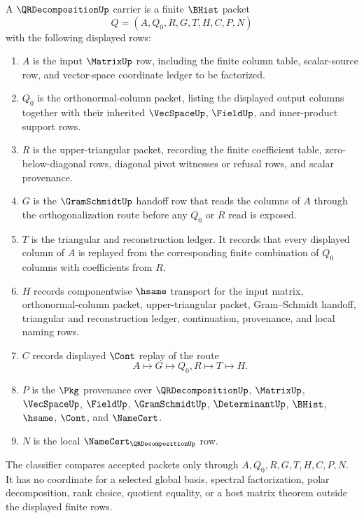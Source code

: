 \begin{definition}
\label{def:qr-decomposition-carrier}
A $\QRDecompositionUp$ carrier is a finite $\BHist$ packet
$$
Q=(A,Q_0,R,G,T,H,C,P,N)
$$
with the following displayed rows:
\begin{enumerate}
\item $A$ is the input $\MatrixUp$ row, including the finite column table, scalar-source row, and vector-space coordinate ledger to be factorized.
\item $Q_0$ is the orthonormal-column packet, listing the displayed output columns together with their inherited $\VecSpaceUp$, $\FieldUp$, and inner-product support rows.
\item $R$ is the upper-triangular packet, recording the finite coefficient table, zero-below-diagonal rows, diagonal pivot witnesses or refusal rows, and scalar provenance.
\item $G$ is the $\GramSchmidtUp$ handoff row that reads the columns of $A$ through the orthogonalization route before any $Q_0$ or $R$ read is exposed.
\item $T$ is the triangular and reconstruction ledger. It records that every displayed column of $A$ is replayed from the corresponding finite combination of $Q_0$ columns with coefficients from $R$.
\item $H$ records componentwise $\hsame$ transport for the input matrix, orthonormal-column packet, upper-triangular packet, Gram--Schmidt handoff, triangular and reconstruction ledger, continuation, provenance, and local naming rows.
\item $C$ records displayed $\Cont$ replay of the route
$$
A \longmapsto G \longmapsto Q_0,R \longmapsto T \longmapsto H .
$$
\item $P$ is the $\Pkg$ provenance over $\QRDecompositionUp$, $\MatrixUp$, $\VecSpaceUp$, $\FieldUp$, $\GramSchmidtUp$, $\DeterminantUp$, $\BHist$, $\hsame$, $\Cont$, and $\NameCert$.
\item $N$ is the local $\NameCert_{\QRDecompositionUp}$ row.
\end{enumerate}
The classifier compares accepted packets only through $A,Q_0,R,G,T,H,C,P,N$. It has no coordinate for a selected global basis, spectral factorization, polar decomposition, rank choice, quotient equality, or a host matrix theorem outside the displayed finite rows.
\end{definition}

